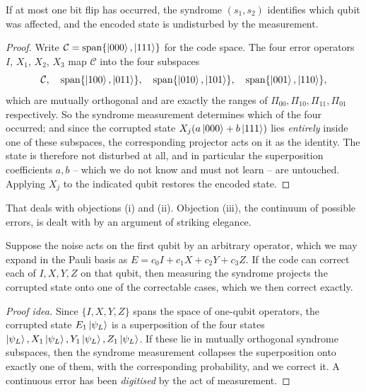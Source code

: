 \documentclass[a4paper]{scrartcl}
\begin{document}
\begin{proposition}
	If at most one bit flip has occurred, the syndrome $(s_1,s_2)$ identifies which qubit was affected, and the encoded state is undisturbed by the measurement.
\end{proposition}

\begin{proof}
	Write $\mathcal C = \operatorname{span}\{\ket{000},\ket{111}\}$ for the code space. The four error operators $I$, $X_1$, $X_2$, $X_3$ map $\mathcal C$ into the four subspaces
	$$\mathcal C,\quad \operatorname{span}\{\ket{100},\ket{011}\},\quad\operatorname{span}\{\ket{010},\ket{101}\},\quad\operatorname{span}\{\ket{001},\ket{110}\},$$
	which are mutually orthogonal and are exactly the ranges of $\Pi_{00},\Pi_{10},\Pi_{11},\Pi_{01}$ respectively. So the syndrome measurement determines which of the four occurred; and since the corrupted state $X_j(a\ket{000}+b\ket{111})$ lies \emph{entirely} inside one of these subspaces, the corresponding projector acts on it as the identity. The state is therefore not disturbed at all, and in particular the superposition coefficients $a,b$ -- which we do not know and must not learn -- are untouched. Applying $X_j$ to the indicated qubit restores the encoded state.
\end{proof}

That deals with objections (i) and (ii). Objection (iii), the continuum of possible errors, is dealt with by an argument of striking elegance.

\begin{proposition}
	Suppose the noise acts on the first qubit by an arbitrary operator, which we may expand in the Pauli basis as $E = c_0I+c_1X+c_2Y+c_3Z$. If the code can correct each of $I,X,Y,Z$ on that qubit, then measuring the syndrome projects the corrupted state onto one of the correctable cases, which we then correct exactly.
\end{proposition}

\begin{proof}[Proof idea]
	Since $\{I,X,Y,Z\}$ spans the space of one-qubit operators, the corrupted state $E_1\ket{\psi_L}$ is a superposition of the four states $\ket{\psi_L}, X_1\ket{\psi_L},Y_1\ket{\psi_L},Z_1\ket{\psi_L}$. If these lie in mutually orthogonal syndrome subspaces, then the syndrome measurement collapses the superposition onto exactly one of them, with the corresponding probability, and we correct it. A continuous error has been \emph{digitised} by the act of measurement.
\end{proof}
\end{document}
